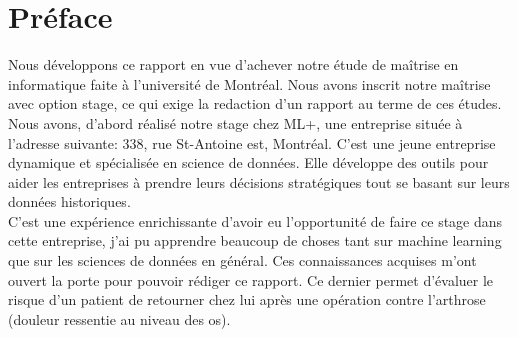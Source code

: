 \documentclass[12pt, french]{report}
\begin{document}
\newpage

\chapter*{Préface}
Nous développons ce rapport en vue d'achever notre étude de maîtrise en informatique faite à l'université de Montréal. Nous avons inscrit notre maîtrise avec option stage, ce qui exige la redaction d'un rapport au terme de ces études. Nous avons, d'abord réalisé notre stage chez ML+, une entreprise située à l'adresse suivante: 338, rue St-Antoine est, Montréal. C'est une jeune entreprise dynamique et spécialisée en science de données. Elle développe des outils pour aider les entreprises à prendre leurs décisions stratégiques tout se basant sur leurs données historiques. \\

C'est une expérience enrichissante d'avoir eu l'opportunité de faire ce stage dans cette entreprise, j'ai pu apprendre beaucoup de choses tant sur machine learning que sur les sciences de données en général. Ces connaissances acquises m'ont ouvert  la porte pour pouvoir rédiger ce rapport. Ce dernier permet d'évaluer le risque d'un patient de retourner chez lui après une opération contre l'arthrose (douleur ressentie au niveau des os).  

\newpage

\listoffigures

\newpage

\listoftables

\newpage

\end{document}
